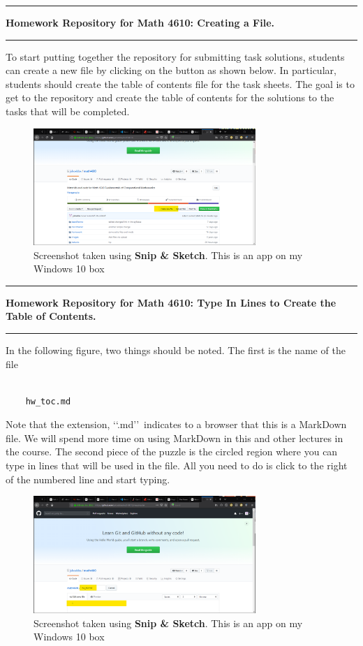 \documentclass[10pt,fleqn]{article}
\begin{document}
\eject
\vskip0.1in\hrule\vskip0.1in
\noindent
{\bf Homework Repository for Math 4610: Creating a File.} 
\vskip0.1in\hrule\vskip0.1in
To start putting together the repository for submitting task solutions, students
can create a new file by clicking on the button as shown below. In particular,
students should create the table of contents file for the task sheets. The goal
is to get to the repository and create the table of contents for the solutions
to the tasks that will be completed.
\vfill
\begin{figure}[h]
\centering
\includegraphics[width=0.75\textwidth]{../images/github_04.png}
\caption{{Screenshot} taken using {\bf Snip \& Sketch}. This is an app on
         my Windows 10 box}
\end{figure}
\eject
\vskip0.1in\hrule\vskip0.1in
\noindent
{\bf Homework Repository for Math 4610: Type In Lines to Create the Table of
Contents.} 
\vskip0.1in\hrule\vskip0.1in
In the following figure, two things should be noted. The first is the name of
the file
\begin{verbatim}

    hw_toc.md

\end{verbatim}
Note that the extension, \lq\lq .md\rq\rq\ indicates to a browser that this is a
MarkDown file. We will spend more time on using MarkDown in this and other
lectures in the course. The second piece of the puzzle is the circled region
where you can type in lines that will be used in the file. All you need to do is
click to the right of the numbered line and start typing.
\vfill
\begin{figure}[h]
\centering
\includegraphics[width=0.75\textwidth]{../images/github_05.png}
\caption{{Screenshot} taken using {\bf Snip \& Sketch}. This is an app on
         my Windows 10 box}
\end{figure}
\end{document}
